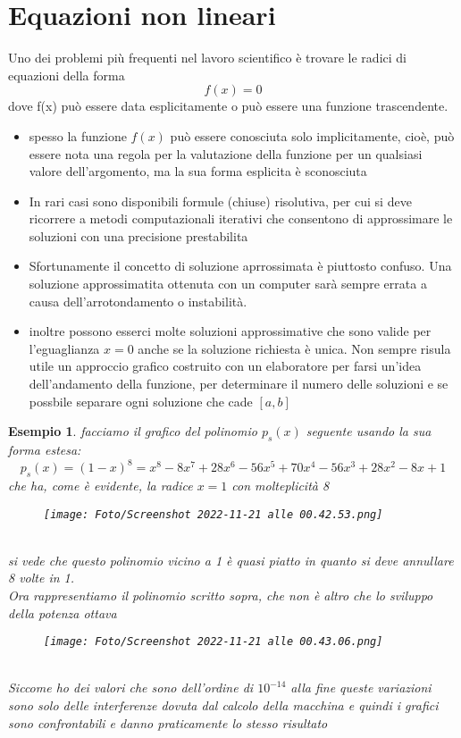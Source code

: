 \documentclass[a4paper, portrait]{book}
\numberwithin{equation}{chapter} %
\newtheorem{example}{Esempio}
\begin{document}
\section{Equazioni non lineari}
Uno dei problemi più frequenti nel lavoro scientifico è trovare le radici di equazioni della forma 
\begin{equation}
    f(x) = 0
\end{equation}
dove f(x) può essere data esplicitamente o può essere una funzione trascendente.
\begin{itemize}
    \item spesso la funzione $f(x)$ può essere conosciuta solo implicitamente, cioè, può essere nota una regola per la valutazione della funzione per un qualsiasi valore dell'argomento, ma la sua forma esplicita è sconosciuta
    \item In rari casi sono disponibili formule (chiuse) risolutiva, per cui si deve ricorrere a metodi computazionali iterativi che consentono di approssimare le soluzioni con una precisione prestabilita
    \item Sfortunamente il concetto di soluzione aprrossimata è piuttosto confuso. Una soluzione approssimatita ottenuta con un computer sarà sempre errata a causa dell'arrotondamento o instabilità.
    \item inoltre possono esserci molte soluzioni approssimative che sono valide per l'eguaglianza $x= 0$ anche se la soluzione richiesta è unica. Non sempre risula utile un approccio grafico costruito con un elaboratore per farsi un'idea dell'andamento della funzione, per determinare il numero delle soluzioni e se possbile separare ogni soluzione che cade $[a,b]$
\end{itemize}
\begin{example}
    facciamo il grafico del polinomio $p_s(x)$ seguente usando la sua forma estesa:
    \begin{equation}
        p_s(x) = (1-x)^8 = x^8 - 8x^7 + 28 x^6 - 56x^5 + 70x^4 -56x^3 + 28x^2 - 8x + 1
    \end{equation}
    che ha, come è evidente, la radice $x = 1$ con molteplicità 8
    \begin{figure}[h!]
        \centering
        \texttt{[image: Foto/Screenshot 2022-11-21 alle 00.42.53.png]}
        \caption{}
    \end{figure}
    \\si vede che questo polinomio vicino a 1 è quasi piatto in quanto si deve annullare 8 volte in 1.\\
    Ora rappresentiamo il polinomio scritto sopra, che non è altro che lo sviluppo della potenza ottava
    \begin{figure}[h!]
        \centering
        \texttt{[image: Foto/Screenshot 2022-11-21 alle 00.43.06.png]}
        \caption{}
    \end{figure}
    \\Siccome ho dei valori che sono dell'ordine di $10^{-14}$ alla fine queste variazioni sono solo delle interferenze dovuta dal calcolo della macchina e quindi i grafici sono confrontabili e danno praticamente lo stesso risultato
\end{example}
\end{document}
